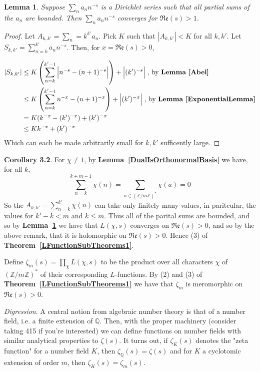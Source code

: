 \documentclass[12pt]{article}
\newcommand{\q}{\mathbb{Q}}
\newcommand{\ints}{\mathbb{Z}}
\newcommand{\intsmod}[1]{\ints / #1 \ints}
\newcommand{\lref}[1]{\textbf{Lemma~\ref{#1}}}
\newcommand{\tref}[1]{\textbf{Theorem~\ref{#1}}}
\newtheorem{lemma}{Lemma}
\numberwithin{equation}{section}
\numberwithin{thm}{section}
\numberwithin{lemma}{section}
\numberwithin{cor}{section}
\begin{document}
\begin{lemma}\label{DirichletTest}
  Suppose $\sum_n a_n n^{-s}$ is a Dirichlet series such that all partial sums of the $a_n$ are bounded. Then $\sum_n a_n n^{-s}$ converges for $\mathfrak{Re}(s) > 1$.
\end{lemma}
\begin{proof}
  Let $A_{k,k'} = \sum_n=k^{k'} a_n$. Pick $K$ such that $|A_{k, k'}| < K$ for all $k, k'$. Let $S_{k, k'} = \sum_{n = k}^{k'} a_n n^{-s}$. Then, for $x = \mathfrak{Re}(s) > 0$, 
  
  \begin{align*}
    |S_{k, k'}| &\leq K \left( \sum_{n = k}^{k'-1} \Big| n^{-s} - (n + 1)^{-s} \Big| \right) + \Big| (k')^{-s} \Big| \text{ , by } \lref{Abel} \\
    &\leq K \left( \sum_{n=k}^{k'-1} n^{-x} - (n+1)^{-x} \right) + \Big| (k')^{-x} \Big| \text{ , by } \lref{ExponentialLemma} \\
    &= K (k^{-x} - (k')^{-x}) + (k')^{-x} \\
    &\leq Kk^{-x} + (k')^{-x}
  \end{align*} Which can each be made arbitrarily small for $k, k'$ sufficently large.
\end{proof}

\textbf{Corollary 3.2}. For $\chi \ne 1$, by \lref{DualIsOrthonormalBasis} we have, for all $k$, \begin{equation*}
  \sum_{n = k}^{k + m - 1} \chi(n) = \sum_{a \in (\intsmod{m})^*} \chi(a) = 0
\end{equation*} So the $A_{k, k'} = \sum_{n=k}^{k'} \chi(n)$ can take only finitely many values, in paritcular, the values for $k' - k < m$ and $k \leq m$. Thus all of the parital sums are bounded, and so by \lref{DirichletTest} we have that $L(\chi, s)$ converges on $\mathfrak{Re}(s) > 0$, and so by the above remark, that it is holomorphic on $\mathfrak{Re}(s) > 0$. Hence (3) of \tref{LFunctionSubTheorems1}.

Define $\zeta_m(s) = \prod_{\chi} L(\chi, s)$ to be the product over all characters $\chi$ of $(\intsmod{m})^*$ of their corresponding $L$-functions. By (2) and (3) of \tref{LFunctionSubTheorems1} we have that $\zeta_m$ is meromorphic on $\mathfrak{Re}(s) > 0$.

\textit{Digression}. A central notion from algebraic number theory is that of a number field, i.e. a finite extension of $\q$. Then, with the proper machinery (consider taking 415 if you're interested) we can define functions on number fields with similar analytical properties to $\zeta(s)$. It turns out, if $\zeta_K(s)$ denotes the "zeta function" for a number field $K$, then $\zeta_{\q}(s) = \zeta(s)$ and for $K$ a cyclotomic extension of order $m$, then $\zeta_K(s) = \zeta_m(s)$.
\end{document}
